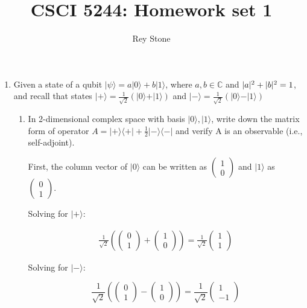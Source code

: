 \documentclass[10pt]{article}
\title{CSCI 5244: Homework set 1}
\author{Rey Stone}
\date{}
\newcommand{\ket}[1]{\vert #1 \rangle}
\newcommand{\bra}[1]{\langle #1 \vert}
\DeclarePairedDelimiter\abs{\lvert}{\rvert}
\begin{document}
\maketitle

\begin{enumerate}
  \item Given a state of a qubit $\ket{\psi} = a \ket{0} + b \ket{1}$, where $a, b \in \mathbb{C}$ and $\abs{a}^2 + \abs{b}^2 = 1$, and recall that states $\ket{+} = \frac{1}{\sqrt{2}} (\ket{0} + \ket{1})$ and $\ket{-} = \frac{1}{\sqrt{2}} (\ket{0} - \ket{1})$

    \begin{enumerate}
      \item In 2-dimensional complex space with basis ${\ket{0}, \ket{1}}$, write down the matrix form of operator $A = \ket{+} \bra{+} + \frac{1}{2} \ket{-} \bra{-}$ and verify A is an observable (i.e., self-adjoint).

        First, the column vector of $\ket{0}$ can be written as $\begin{pmatrix} 1 \\ 0 \end{pmatrix}$ and $\ket{1}$ as $\begin{pmatrix} 0 \\ 1 \end{pmatrix}$.

        Solving for $\ket{+}$:

        \begin{align*}
          \frac{1}{\sqrt{2}} \left(\begin{pmatrix} 0 \\ 1 \end{pmatrix} + \begin{pmatrix} 1 \\ 0 \end{pmatrix} \right) = \frac{1}{\sqrt{2}} \begin{pmatrix} 1 \\ 1 \end{pmatrix}
        \end{align*}

        Solving for $\ket{-}$:

        \begin{equation*}
          \frac{1}{\sqrt{2}} \left(\begin{pmatrix} 0 \\ 1 \end{pmatrix} - \begin{pmatrix} 1 \\ 0 \end{pmatrix} \right) = \frac{1}{\sqrt{2}} \begin{pmatrix} 1 \\ -1 \end{pmatrix}
        \end{equation*}


\end{enumerate}
\end{enumerate}
\end{document}
